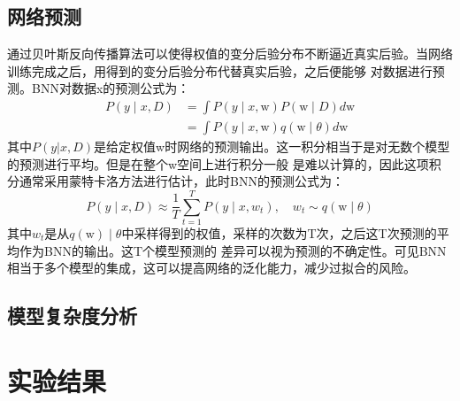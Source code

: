 \subsection{网络预测}
通过贝叶斯反向传播算法可以使得权值的变分后验分布不断逼近真实后验。当网络训练完成之后，用得到的变分后验分布代替真实后验，之后便能够
对数据进行预测。BNN对数据x的预测公式为：
\begin{equation}
	\label{}
	\begin{aligned}
	P(y \mid x, D) & =\int P(y \mid x, \mathrm{w}) P(\mathrm{w} \mid D) d \mathrm{w} \\
	& =\int P(y \mid x, \mathrm{w}) q(\mathrm{w} \mid \theta) d \mathrm{w}
	\end{aligned}
\end{equation}
其中$P(y|x,D)$是给定权值w时网络的预测输出。这一积分相当于是对无数个模型的预测进行平均。但是在整个w空间上进行积分一般
是难以计算的，因此这项积分通常采用蒙特卡洛方法进行估计，此时BNN的预测公式为：
\begin{equation}
	\label{}
	P(y \mid x, D) \approx \frac{1}{T} \sum_{t=1}^T P\left(y \mid x, w_t\right), \quad w_t \sim q(\mathrm{w} \mid \theta)
\end{equation}
其中$w_t$是从$q(\mathrm{w})\mid\theta$中采样得到的权值，采样的次数为T次，之后这T次预测的平均作为BNN的输出。这T个模型预测的
差异可以视为预测的不确定性。可见BNN相当于多个模型的集成，这可以提高网络的泛化能力，减少过拟合的风险。
%
\subsection{模型复杂度分析}

%
\section{实验结果}
